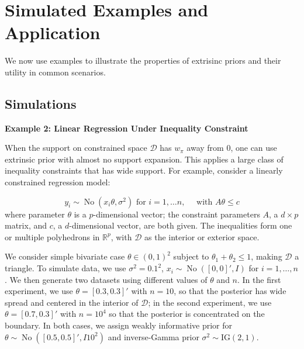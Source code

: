 \documentclass[10pt]{article}
\newcommand{\leo}[1]{{\color{blue}{Leo: #1}}}
\newcommand{\mc}[1]{\mathcal{#1}}
\DeclareMathOperator{\No}{No}
\DeclareMathOperator{\1}{\mathbbm{1}}
\begin{document}
\leo{Yes, that is one possibility. David and I talked about this a while ago. We didn't go in this direction because we want to keep the algorithm as simple as possible, provided the approximation error is reasonably bounded, then we can suggest projection or adaptive algorithm as follow-up remedy. I think a non-asymptotic bound on approximation error and some numeric Wasserstein/ TV distances on the examples below should suffice; but I'm open to new algorithm if really necessary.}





\section{Simulated Examples and Application}

We now use examples to illustrate the properties of extrisinc priors and their utility in common scenarios.

\subsection{Simulations}

{\bf Example 2: Linear Regression Under Inequality Constraint}

When the support on constrained space $\mc D$ has $w_\pi$ away from $0$, one can use extrinsic prior with almost no support expansion. This applies a large class of inequality constraints that has wide support. For example, consider a linearly constrained regression model:

$$y_i \sim \No (x_i \theta, \sigma^2) \text{ for } i=1,\ldots n, \quad\text{ with } A\theta \le c$$
where parameter $\theta$ is a $p$-dimensional vector; the constraint parameters $A$, a $d\times p$ matrix, and $c$, a $d$-dimensional vector, are both given. The inequalities form one or multiple polyhedrons in $\mathbb R^p$, with $\mc D$ as the interior or exterior space.

We consider simple bivariate case $\theta \in (0,1)^2$ subject to $\theta_1+\theta_2\le 1$, making $\mc D$ a triangle. To simulate data, we use $\sigma^2=0.1^2$, $x_i\sim \No([0,0]',I)$ for $i=1,\ldots,n$. We then generate two datasets using different values of $\theta$ and $n$. In the first experiment, we use $\theta=[0.3,0.3]'$ with $n=10$, so that the posterior has wide spread and centered in the interior of $\mc D$; in the second experiment, we use $\theta=[0.7,0.3]'$ with $n=10^4$ so that the posterior is concentrated on the boundary. In both cases, we assign weakly informative prior for $\theta\sim \No([0.5, 0.5]',I10^2)$ and inverse-Gamma prior $\sigma^2\sim \text{IG}(2,1)$.
\end{document}
